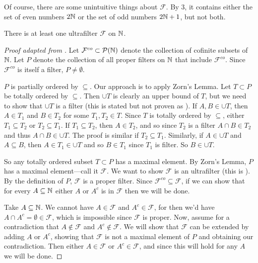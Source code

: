 Of course, there are some unintuitive things about $\mathcal{F}$. By 3, it contains either the set of even numbers $2\mathbb{N}$ or the set of odd numbers $2\mathbb{N} + 1$, but not both.

\begin{thm}
    There is at least one ultrafilter $\mathcal{F}$ on $\mathbb{N}$.
\end{thm}

\begin{proof}[Proof adapted from ]
    Let $\mathcal{F}^{co} \subset \mathcal{P}(\mathbb{N})$ denote the collection of cofinite subsets of $\mathbb{N}$. Let $P$ denote the collection of all proper filters on $\mathbb{N}$ that include $\mathcal{F}^{co}$. Since $\mathcal{F}^{co}$ is itself a filter, $P \neq \emptyset$. 

    $P$ is partially ordered by $\subseteq$. Our approach is to apply Zorn's Lemma. Let $T \subset P$ be totally ordered by $\subseteq$. Then $\cup T$ is clearly an upper bound of $T$, but we need to show that $\cup T$ is a filter (this is stated but not proven as \cite[Example~2.4(4)]{goldblatt1998}). If $A, B \in \cup T$, then $A \in T_1$ and $B \in T_2$ for some $T_1, T_2 \in T$. Since $T$ is totally ordered by $\subseteq$, either $T_1 \subseteq T_2$ or $T_2 \subseteq T_1$. If $T_1 \subseteq T_2$, then $A \in T_2$, and so since $T_2$ is a filter $A \cap B \in T_2$ and thus $A \cap B \in \cup T$. The proof is similar if $T_2 \subseteq T_1$. Similarly, if $A \in \cup T$ and $A \subseteq B$, then $A \in T_1 \in \cup T$ and so $B \in T_1$ since $T_1$ is  filter. So $B \in \cup T$.

    So any totally ordered subset $T \subset P$ has a maximal element. By Zorn's Lemma, $P$ has a maximal element---call it $\mathcal{F}$. We want to show $\mathcal{F}$ is an ultrafilter (this is \cite[Exercise~2.5(6)]{goldblatt1998}). By the definition of $P$, $\mathcal{F}$ is a proper filter. Since $\mathcal{F}^{co} \subseteq \mathcal{F}$, if we can show that for every $A \subseteq \mathbb{N}$ either $A$ or $A^c$ is in $\mathcal{F}$ then we will be done.

    Take $A \subseteq \mathbb{N}$. We cannot have $A \in \mathcal{F}$ and $A^c \in \mathcal{F}$, for then we'd have $A \cap A^c = \emptyset \in \mathcal{F}$, which is impossible since $\mathcal{F}$ is proper. Now, assume for a contradiction that $A \notin \mathcal{F}$ and $A^c \notin \mathcal{F}$. We will show that $\mathcal{F}$ can be extended by adding $A$ or $A^c$, showing that $\mathcal{F}$ is not a maximal element of $P$ and obtaining our contradiction. Then either $A \in \mathcal{F}$ or $A^c \in \mathcal{F}$, and since this will hold for any $A$ we will be done.


\end{proof}
